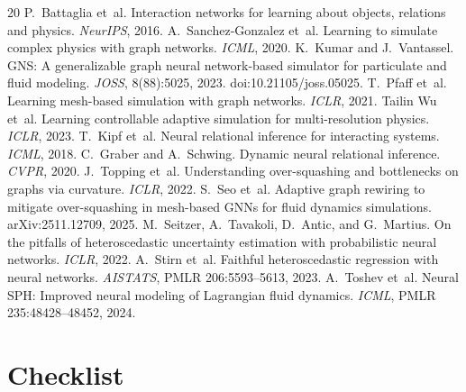 \begin{thebibliography}{20}
 P.~Battaglia et~al. Interaction networks for learning about objects, relations and physics. \emph{NeurIPS}, 2016.
 A.~Sanchez-Gonzalez et~al. Learning to simulate complex physics with graph networks. \emph{ICML}, 2020.
 K.~Kumar and J.~Vantassel. GNS: A generalizable graph neural network-based simulator for particulate and fluid modeling. \emph{JOSS}, 8(88):5025, 2023. doi:10.21105/joss.05025.
 T.~Pfaff et~al. Learning mesh-based simulation with graph networks. \emph{ICLR}, 2021.
 Tailin Wu et~al. Learning controllable adaptive simulation for multi-resolution physics. \emph{ICLR}, 2023.
 T.~Kipf et~al. Neural relational inference for interacting systems. \emph{ICML}, 2018.
 C.~Graber and A.~Schwing. Dynamic neural relational inference. \emph{CVPR}, 2020.
 J.~Topping et~al. Understanding over-squashing and bottlenecks on graphs via curvature. \emph{ICLR}, 2022.
 S.~Seo et~al. Adaptive graph rewiring to mitigate over-squashing in mesh-based GNNs for fluid dynamics simulations. arXiv:2511.12709, 2025.
 M.~Seitzer, A.~Tavakoli, D.~Antic, and G.~Martius. On the pitfalls of heteroscedastic uncertainty estimation with probabilistic neural networks. \emph{ICLR}, 2022.
 A.~Stirn et~al. Faithful heteroscedastic regression with neural networks. \emph{AISTATS}, PMLR 206:5593--5613, 2023.
 A.~Toshev et~al. Neural SPH: Improved neural modeling of Lagrangian fluid dynamics. \emph{ICML}, PMLR 235:48428--48452, 2024.
\end{thebibliography}

\section*{Checklist}

